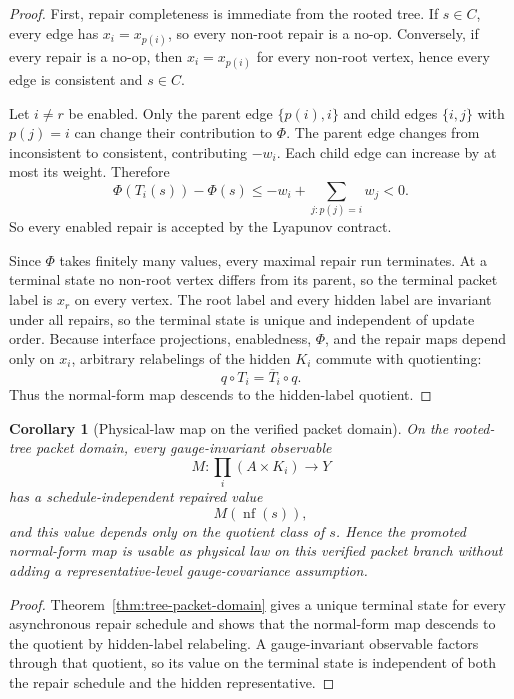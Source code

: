 \documentclass[11pt]{article}
\newtheorem{corollary}[theorem]{Corollary}
\theoremstyle{remark}
\theoremstyle{plain}
\begin{document}
\begin{proof}
First, repair completeness is immediate from the rooted tree. If \(s\in C\), every edge has
\(x_i=x_{p(i)}\), so every non-root repair is a no-op. Conversely, if every repair is a no-op,
then \(x_i=x_{p(i)}\) for every non-root vertex, hence every edge is consistent and \(s\in C\).

Let \(i\ne r\) be enabled. Only the parent edge \(\{p(i),i\}\) and child edges
\(\{i,j\}\) with \(p(j)=i\) can change their contribution to \(\Phi\). The parent edge changes
from inconsistent to consistent, contributing \(-w_i\). Each child edge can increase by at most
its weight. Therefore
\[
\Phi(T_i(s))-\Phi(s)
\le
-w_i+\sum_{j:p(j)=i}w_j
<0.
\]
So every enabled repair is accepted by the Lyapunov contract.

Since \(\Phi\) takes finitely many values, every maximal repair run terminates. At a terminal
state no non-root vertex differs from its parent, so the terminal packet label is \(x_r\) on every
vertex. The root label and every hidden label are invariant under all repairs, so the terminal
state is unique and independent of update order. Because interface projections, enabledness,
\(\Phi\), and the repair maps depend only on \(x_i\), arbitrary relabelings of the hidden
\(K_i\) commute with quotienting:
\[
q\circ T_i=\overline T_i\circ q.
\]
Thus the normal-form map descends to the hidden-label quotient.
\end{proof}

\begin{corollary}[Physical-law map on the verified packet domain]\label{cor:tree-packet-law}
On the rooted-tree packet domain, every gauge-invariant observable
\[
M:\prod_i(A\times K_i)\to Y
\]
has a schedule-independent repaired value
\[
M(\operatorname{nf}(s)),
\]
and this value depends only on the quotient class of \(s\). Hence the promoted normal-form map is
usable as physical law on this verified packet branch without adding a representative-level
gauge-covariance assumption.
\end{corollary}

\begin{proof}
Theorem~\ref{thm:tree-packet-domain} gives a unique terminal state for every asynchronous repair
schedule and shows that the normal-form map descends to the quotient by hidden-label relabeling.
A gauge-invariant observable factors through that quotient, so its value on the terminal state is
independent of both the repair schedule and the hidden representative.
\end{proof}
\end{document}
